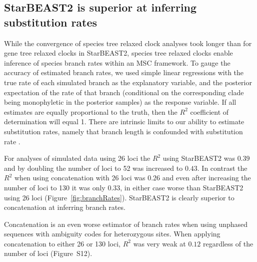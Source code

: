 \documentclass[nogrid]{MBE}%
\begin{document}
\subsection{StarBEAST2 is superior at inferring substitution rates}

While the convergence of species tree relaxed clock analyses took longer than
for gene tree relaxed clocks in StarBEAST2, species tree relaxed clocks enable
inference of species branch rates within an MSC framework. To gauge the
accuracy of estimated branch rates, we used simple linear regressions with the
true rate of each simulated branch as the explanatory variable, and the
posterior expectation of the rate of that branch (conditional on the
corresponding clade being monophyletic in the posterior samples) as the
response variable. If all estimates are equally proportional to the truth,
then the $R^2$ coefficient of determination will equal 1. There are intrinsic
limits to our ability to estimate substitution rates, namely that branch
length is confounded with substitution rate \citep{Thorne01092002}.

For analyses of simulated data using 26 loci the $R^2$ using StarBEAST2 was
$0.39$ and by doubling the number of loci to 52 was increased to $0.43$. In
contrast the $R^2$ when using concatenation with 26 loci was $0.26$ and even after
increasing the number of loci to 130 it was only $0.33$, in either case worse
than StarBEAST2 using 26 loci (Figure~\ref{fig:branchRates}). StarBEAST2 is
clearly superior to concatenation at inferring branch rates.

Concatenation is an even worse estimator of branch rates when using unphased
sequences with ambiguity codes for heterozygous sites. When applying
concatenation to either 26 or 130 loci, $R^2$ was very weak at $0.12$ regardless
of the number of loci (Figure~S12).
\end{document}
